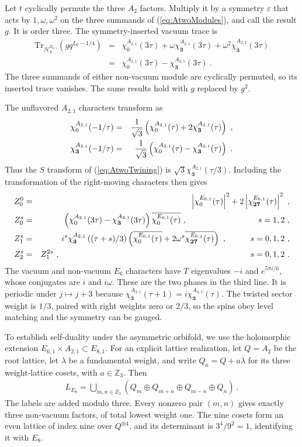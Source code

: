 \documentclass[12pt]{article}
\numberwithin{equation}{section}
\newcommand{\bea}{\begin{eqnarray}}
\newcommand{\eea}{\end{eqnarray}}
\def\no{\nonumber}
\def\ZZ{\mathbb{Z}}
\newcommand{\Tr}{\mathrm{Tr}}
\theoremstyle{remark}
\begin{document}
Let $t$ cyclically permute the three $A_2$ factors. Multiply it by a symmetry $\varepsilon$ that acts by $1,\omega,\omega^2$ on the three summands of (\ref{eq:AtwoModules}), and call the result $g$. It is order three. The symmetry-inserted vacuum trace is
\bea \label{eq:AtwoTwining}
\Tr_{\mathcal H^{E_{6,1}}_{\mathbf1}}\left(gq^{L_0-1/4}\right)&=&\chi^{A_{2,1}}_0(3\tau)+\omega\chi^{A_{2,1}}_{\mathbf3}(3\tau)+\omega^2\chi^{A_{2,1}}_{\overline{\mathbf3}}(3\tau)\no\\
&=&\chi^{A_{2,1}}_0(3\tau)-\chi^{A_{2,1}}_{\mathbf3}(3\tau)~.
\eea
The three summands of either non-vacuum module are cyclically permuted, so its inserted trace vanishes. The same results hold with $g$ replaced by $g^2$.

The unflavored $A_{2,1}$ characters transform as
\bea
\chi^{A_{2,1}}_0(-1/\tau)&=&{1\over \sqrt3}\left(\chi^{A_{2,1}}_0(\tau)+2\chi^{A_{2,1}}_{\mathbf3}(\tau)\right)~,\no\\
\chi^{A_{2,1}}_{\mathbf3}(-1/\tau)&=&{1\over \sqrt3}\left(\chi^{A_{2,1}}_0(\tau)-\chi^{A_{2,1}}_{\mathbf3}(\tau)\right)~.
\eea
Thus the $S$ transform of (\ref{eq:AtwoTwining}) is $\sqrt3\chi^{A_{2,1}}_{\mathbf3}(\tau/3)$. Including the transformation of the right-moving characters then gives
\bea \label{eq:AtwoBlocks}
Z^0_0&=&\left|\chi^{E_{6,1}}_0(\tau)\right|^2+2\left|\chi^{E_{6,1}}_{\mathbf{27}}(\tau)\right|^2~,\no\\
Z^s_0&=&\left(\chi^{A_{2,1}}_0(3\tau)-\chi^{A_{2,1}}_{\mathbf3}(3\tau)\right)\overline{\chi^{E_{6,1}}_0(\tau)}~,
\hspace{1.2 in}s=1,2~,\no\\
Z^s_1&=&i^s\chi^{A_{2,1}}_{\mathbf3}\left((\tau+s)/3\right)\left(\overline{\chi^{E_{6,1}}_0(\tau)}+2\omega^s\overline{\chi^{E_{6,1}}_{\mathbf{27}}(\tau)}\right)~,
\hspace{0.4 in}s=0,1,2~,\no\\
Z^s_2&=&Z^{2s}_1~,
\hspace{3.22 in}s=0,1,2~.
\eea
The vacuum and non-vacuum $E_6$ characters have $T$ eigenvalues $-i$ and $e^{5\pi i/6}$, whose conjugates are $i$ and $i\omega$. These are the two phases in the third line. It is periodic under $j\mapsto j+3$ because $\chi^{A_{2,1}}_{\mathbf3}(\tau+1)=i\chi^{A_{2,1}}_{\mathbf3}(\tau)$. The twisted sector weight is $1/3$, paired with right weights zero or $2/3$, so the spins obey level matching and the symmetry can be gauged.

To establish self-duality under the asymmetric orbifold, we use the holomorphic extension $E_{6,1}\times A_{2,1}\subset E_{8,1}$. 
For an explicit lattice realization, let $Q=A_2$ be the root lattice, let $\lambda$ be a fundamental weight, and write $Q_a=Q+a\lambda$ for its three weight-lattice cosets, with $a\in\ZZ_3$. Then
\bea
L_{E_8}=\bigcup_{m,n\in\ZZ_3}\left(Q_m\oplus Q_{m+n}\oplus Q_{m-n}\oplus Q_n\right)~.
\eea
The labels are added modulo three. Every nonzero pair $(m,n)$ gives exactly three non-vacuum factors, of total lowest weight one. The nine cosets form an even lattice of index nine over $Q^{\oplus4}$, and its determinant is $3^4/9^2=1$, identifying it with $E_8$.
\end{document}
